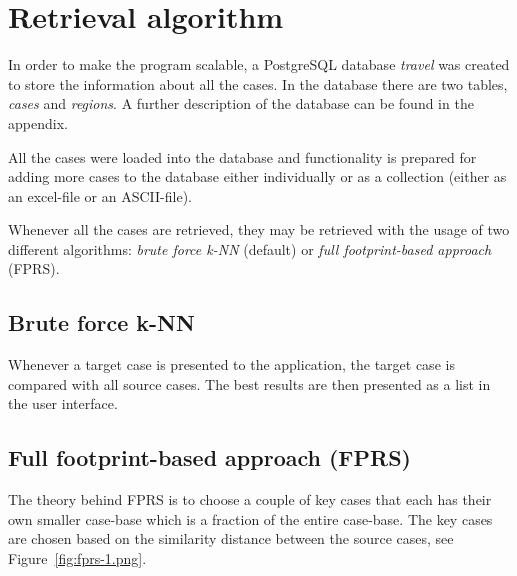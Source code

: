 \documentclass[12pt]{article}
\begin{document}
\clearpage

\section{Retrieval algorithm}
\label{sec:retrieval}

In order to make the program scalable, a PostgreSQL database \textit{travel} was created to store the information about all the cases. In the database there are two tables, \textit{cases} and \textit{regions}. A further description of the database can be found in the appendix. 

All the cases were loaded into the database and functionality is prepared for adding more cases to the database either individually or as a collection (either as an excel-file or an ASCII-file). 

Whenever all the cases are retrieved, they may be retrieved with the usage of two different algorithms: \textit{brute force k-NN} (default) or \textit{full footprint-based approach} (FPRS). 

\subsection{Brute force k-NN}
\label{sec:knn}

Whenever a target case is presented to the application, the target case is compared with all source cases. The best results are then presented as a list in the user interface. 

\subsection{Full footprint-based approach (FPRS)}
\label{sec:fprs}

The theory behind FPRS is to choose a couple of key cases that each has their own smaller case-base which is a fraction of the entire case-base. The key cases are chosen based on the similarity distance between the source cases, see Figure~\ref{fig:fprs-1.png}.\cite{lect}
\end{document}
